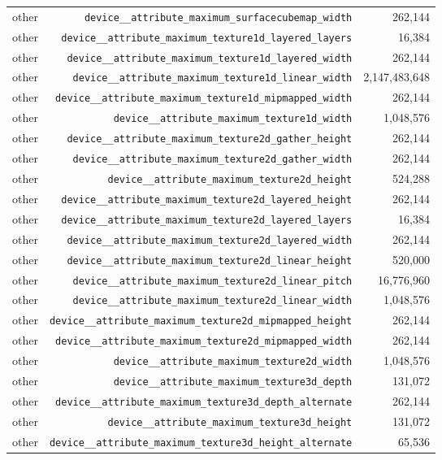 \begin{table}[h]
\begin{tabular}{|l|r|r|}
other & \texttt{device__attribute_maximum_surfacecubemap_width} & 262,144 \\
other & \texttt{device__attribute_maximum_texture1d_layered_layers} & 16,384 \\
other & \texttt{device__attribute_maximum_texture1d_layered_width} & 262,144 \\
other & \texttt{device__attribute_maximum_texture1d_linear_width} & 2,147,483,648 \\
other & \texttt{device__attribute_maximum_texture1d_mipmapped_width} & 262,144 \\
other & \texttt{device__attribute_maximum_texture1d_width} & 1,048,576 \\
other & \texttt{device__attribute_maximum_texture2d_gather_height} & 262,144 \\
other & \texttt{device__attribute_maximum_texture2d_gather_width} & 262,144 \\
other & \texttt{device__attribute_maximum_texture2d_height} & 524,288 \\
other & \texttt{device__attribute_maximum_texture2d_layered_height} & 262,144 \\
other & \texttt{device__attribute_maximum_texture2d_layered_layers} & 16,384 \\
other & \texttt{device__attribute_maximum_texture2d_layered_width} & 262,144 \\
other & \texttt{device__attribute_maximum_texture2d_linear_height} & 520,000 \\
other & \texttt{device__attribute_maximum_texture2d_linear_pitch} & 16,776,960 \\
other & \texttt{device__attribute_maximum_texture2d_linear_width} & 1,048,576 \\
other & \texttt{device__attribute_maximum_texture2d_mipmapped_height} & 262,144 \\
other & \texttt{device__attribute_maximum_texture2d_mipmapped_width} & 262,144 \\
other & \texttt{device__attribute_maximum_texture2d_width} & 1,048,576 \\
other & \texttt{device__attribute_maximum_texture3d_depth} & 131,072 \\
other & \texttt{device__attribute_maximum_texture3d_depth_alternate} & 262,144 \\
other & \texttt{device__attribute_maximum_texture3d_height} & 131,072 \\
other & \texttt{device__attribute_maximum_texture3d_height_alternate} & 65,536 \\

\end{tabular}
\end{table}
